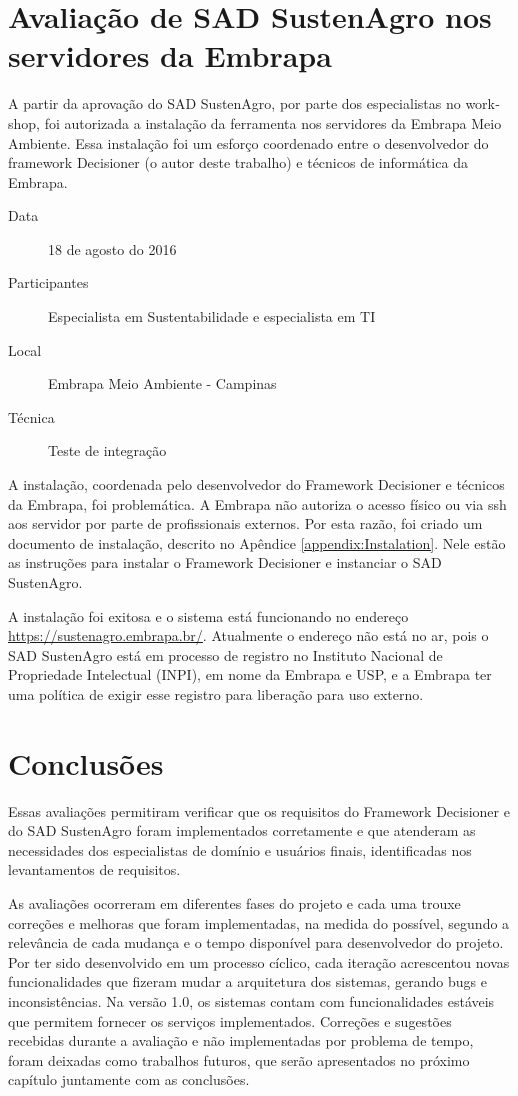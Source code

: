 \section{Avaliação de SAD SustenAgro nos servidores da Embrapa}

A partir da aprovação do SAD SustenAgro, por parte dos especialistas
no \foreignlanguage{english}{workshop}, foi autorizada a instalação
da ferramenta nos servidores da Embrapa Meio Ambiente. Essa instalação
foi um esforço coordenado entre o desenvolvedor do framework Decisioner
(o autor deste trabalho) e técnicos de informática da Embrapa.
\begin{description}
\item [{Data}] 18 de agosto do 2016
\item [{Participantes}] Especialista em Sustentabilidade e especialista
em TI
\item [{Local}] Embrapa Meio Ambiente - Campinas
\item [{Técnica}] Teste de integração
\end{description}
A instalação, coordenada pelo desenvolvedor do Framework Decisioner
e técnicos da Embrapa, foi problemática. A Embrapa não autoriza o
acesso físico ou via ssh aos servidor por parte de profissionais externos.
Por esta razão, foi criado um documento de instalação, descrito no
Apêndice \ref{appendix:Instalation}. Nele estão as instruções para
instalar o Framework Decisioner e instanciar o SAD SustenAgro.

A instalação foi exitosa e o sistema está funcionando no endereço
\url{https://sustenagro.embrapa.br/}. Atualmente o endereço não está
no ar, pois o SAD SustenAgro está em processo de registro no Instituto
Nacional de Propriedade Intelectual (INPI), em nome da Embrapa e USP,
e a Embrapa ter uma política de exigir esse registro para liberação
para uso externo.

\section{Conclusões}

Essas avaliações permitiram verificar que os requisitos do Framework
Decisioner e do SAD SustenAgro foram implementados corretamente e
que atenderam as necessidades dos especialistas de domínio e usuários
finais, identificadas nos levantamentos de requisitos.

As avaliações ocorreram em diferentes fases do projeto e cada uma
trouxe correções e melhoras que foram implementadas, na medida do
possível, segundo a relevância de cada mudança e o tempo disponível
para desenvolvedor do projeto. Por ter sido desenvolvido em um processo
cíclico, cada iteração acrescentou novas funcionalidades que fizeram
mudar a arquitetura dos sistemas, gerando \foreignlanguage{english}{bugs}
e inconsistências. Na versão 1.0, os sistemas contam com funcionalidades
estáveis que permitem fornecer os serviços implementados. Correções
e sugestões recebidas durante a avaliação e não implementadas por
problema de tempo, foram deixadas como trabalhos futuros, que serão
apresentados no próximo capítulo juntamente com as conclusões.
